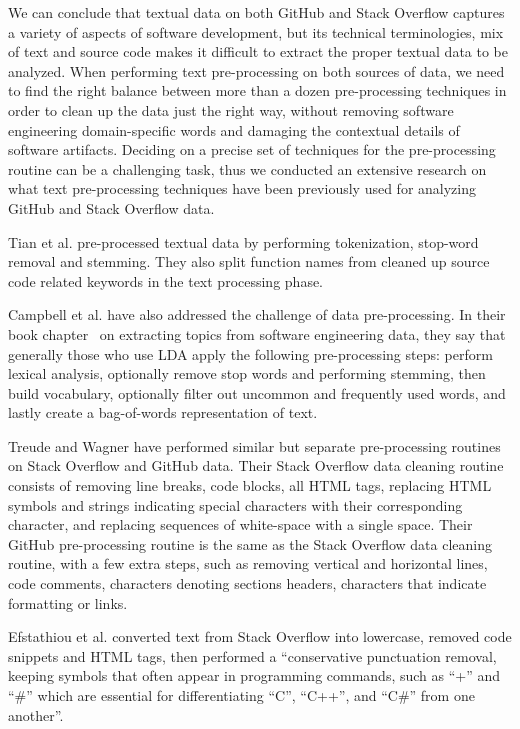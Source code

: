     We can conclude that textual data on both GitHub and Stack Overflow captures a variety of aspects of software development, but its technical terminologies, mix of text and source code makes it difficult to extract the proper textual data to be analyzed. When performing text pre-processing on both sources of data, we need to find the right balance between more than a dozen pre-processing techniques in order to clean up the data just the right way, without removing software engineering domain-specific words and damaging the contextual details of software artifacts. Deciding on a precise set of techniques for the pre-processing routine can be a challenging task, thus we conducted an extensive research on what text pre-processing techniques have been previously used for analyzing GitHub and Stack Overflow data.
    
    Tian et al. \cite{tian2013predicting} pre-processed textual data by performing tokenization, stop-word removal and stemming. They also split function names from cleaned up source code related keywords in the text processing phase.
    
    Campbell et al. have also addressed the challenge of data pre-processing. In their
    book chapter~\cite{campbell2015latent} on extracting topics from software engineering data, they say that generally those who use LDA apply the following pre-processing steps: perform lexical analysis, optionally remove stop words and performing stemming, then build vocabulary, optionally filter out uncommon and frequently used words, and lastly create a bag-of-words representation of text.
    
    Treude and Wagner \cite{treude2019predicting} have performed similar but separate pre-processing routines on Stack Overflow and GitHub data. Their Stack Overflow data cleaning routine consists of removing line breaks, code blocks, all HTML tags, replacing HTML symbols and strings indicating special characters with their corresponding character, and replacing sequences of white-space with a single space. Their GitHub pre-processing routine is the same as the Stack Overflow data cleaning routine, with a few extra steps, such as removing vertical and horizontal lines, code comments, characters denoting sections headers, characters that indicate formatting or links. 
    
    Efstathiou et al. \cite{efstathiou2018word} converted text from Stack Overflow into lowercase, removed code snippets and HTML tags, then performed a ``conservative punctuation removal, keeping symbols that often appear in programming commands, such as ``+'' and ``\#'' which are essential for differentiating ``C'', ``C++'', and ``C\#'' from one another''. 
    
